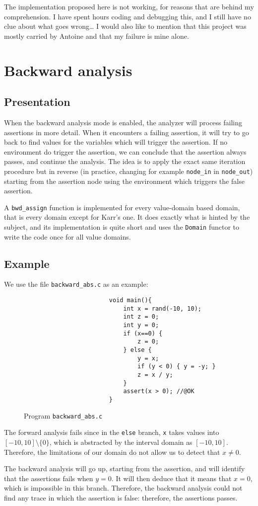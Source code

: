 \documentclass[12pt,a4paper]{article}
\begin{document}
The implementation proposed here is not working, for reasons that are behind my comprehension. I have spent hours coding and debugging this, and I still have no clue about what goes wrong\dots
I would also like to mention that this project was mostly carried by Antoine and that my failure is mine alone.

\section{Backward analysis}
\subsection{Presentation}
When the backward analysis mode is enabled, the analyzer will process failing assertions in more detail. When it encounters a failing assertion, it will try to go back to find values for the variables which will trigger the assertion. If no environment do trigger the assertion, we can conclude that the assertion always passes, and continue the analysis. The idea is to apply the exact same iteration procedure but in reverse (in practice, changing for example \texttt{node\_in} in \texttt{node\_out}) starting from the assertion node using the environment which triggers the false assertion.

A \texttt{bwd\_assign} function is implemented for every value-domain based domain, that is every domain except for Karr's one. It does exactly what is hinted by the subject, and its implementation is quite short and uses the \texttt{Domain} functor to write the code once for all value domains.

\subsection{Example}
We use the file \texttt{backward\_abs.c} as an example:
\begin{figure}[H]
    \centering
    \begin{verbatim}
                        void main(){
                            int x = rand(-10, 10);
                            int z = 0;
                            int y = 0;
                            if (x==0) {
                                z = 0;
                            } else {
                                y = x;
                                if (y < 0) { y = -y; }
                                z = x / y;
                            }
                            assert(x > 0); //@OK
                        }
    \end{verbatim}
    \caption{Program \texttt{backward\_abs.c}}
\end{figure}
The forward analysis fails since in the \texttt{else} branch, \texttt{x} takes values into $[-10, 10]\setminus\{0\}$, which is abstracted by the interval domain as $[-10, 10]$. Therefore, the limitations of our domain do not allow us to detect that $x\neq 0$.

The backward analysis will go up, starting from the assertion, and will identify that the assertions fails when $y=0$. It will then deduce that it means that $x=0$, which is impossible in this branch. Therefore, the backward analysis could not find any trace in which the assertion is false: therefore, the assertions passes.
\end{document}
